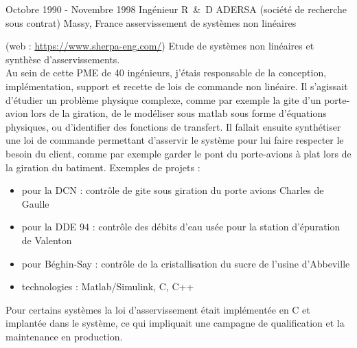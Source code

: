 
\item{
\cventry
{Octobre 1990 - Novembre 1998} %
{Ingénieur R~\&~D } %
{ADERSA (société de recherche sous contrat)} %
{Massy, France} %
{asservissement de systèmes non linéaires
}
{ 
(web : \href{https://www.sherpa-eng.com/}{https://www.sherpa-eng.com/})
Etude de systèmes non linéaires et synthèse d'asservissements.    \\[6pt]
Au sein de cette PME de 40 ingénieurs, j'étais responsable de la conception, implémentation, support et recette de lois de commande non linéaire. Il s'agissait d'étudier un problème physique complexe, comme par exemple la gite d'un porte-avion lors de la giration, de le modéliser sous matlab sous forme d'équations physiques, ou d'identifier des fonctions de transfert. Il fallait ensuite synthétiser une loi de commande permettant d'asservir le système pour lui faire respecter le besoin du client, comme par exemple garder le pont du porte-avions à plat lors de la giration du batiment.
\newline
Exemples de projets :
\begin{itemize}
\item {pour la DCN : contrôle de gite sous giration du porte avions Charles de Gaulle}
\item {pour la DDE 94 : contrôle des débits d'eau usée pour la station d'épuration de Valenton}
\item {pour Béghin-Say : contrôle de la cristallisation du sucre de l'usine d'Abbeville}
\item {technologies : Matlab/Simulink, C, C++}
\end{itemize}
Pour certains systèmes la loi d'asservissement était implémentée en C et implantée dans le système, ce qui impliquait une campagne de qualification et la maintenance en production.
} %
} %